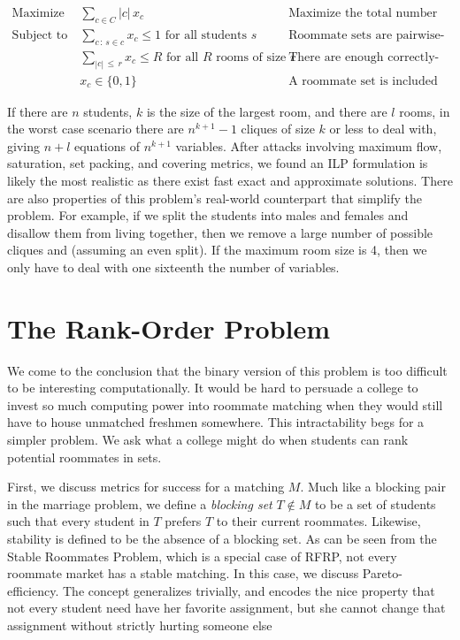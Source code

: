 \documentclass[11pt]{article}
\begin{document}
\begin{align*}
\text{Maximize }   & \sum_{c \in C} |c| \, x_c &&\text{Maximize the total number of students covered}\\
\text{Subject to } & \sum_{c \, : \, s \in c} x_c \leq 1 \text{ for all students $s$} && \text{Roommate sets are pairwise-disjoint}\\
& \sum_{|c| \, \leq \, r} x_c \leq R \text{ for all $R$ rooms of size $r$} && \text{There are enough correctly-sized rooms}\\
& x_c \in \{0, 1\} && \text{A roommate set is included or not}
\end{align*}

If there are $n$ students, $k$ is the size of the largest room, and there are $l$ rooms, in the worst case scenario there are $n^{k + 1} - 1$ cliques of size $k$ or less to deal with, giving $n + l$ equations of $n^{k + 1}$ variables.  After attacks involving maximum flow, saturation, set packing, and covering metrics, we found an ILP formulation is likely the most realistic as there exist fast exact and approximate solutions. There are also properties of this problem's real-world counterpart that simplify the problem. For example, if we split the students into males and females and disallow them from living together, then we remove a large number of possible cliques and (assuming an even split). If the maximum room size is 4, then we only have to deal with one sixteenth the number of variables.


\section*{The Rank-Order Problem}
We come to the conclusion that the binary version of this problem is too difficult to be interesting computationally. It would be hard to persuade a college to invest so much computing power into roommate matching when they would still have to house unmatched freshmen somewhere. This intractability begs for a simpler problem. We ask what a college might do when students can rank potential roommates in sets. 

First, we discuss metrics for success for a matching $M$. Much like a blocking pair in the marriage problem, we define a \textit{blocking set} $T \notin M$ to be a set of students such that every student in $T$ prefers $T$ to their current roommates. Likewise, stability is defined to be the absence of a blocking set. As can be seen from the Stable Roommates Problem, which is a special case of RFRP, not every roommate market has a stable matching. In this case, we discuss Pareto-efficiency. The concept generalizes trivially, and encodes the nice property that not every student need have her favorite assignment, but she cannot change that assignment without strictly hurting someone else
\end{document}
